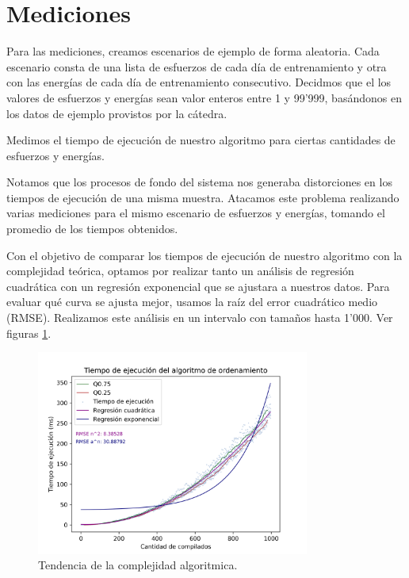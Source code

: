 \section{Mediciones}


Para las mediciones, creamos escenarios de ejemplo de forma aleatoria. Cada escenario consta de
una lista de esfuerzos de cada día de entrenamiento y otra con las energías de cada día de
entrenamiento consecutivo. Decidmos que el los valores de esfuerzos y energías sean valor enteros
entre 1 y 99'999, basándonos en los datos de ejemplo provistos por la cátedra.

Medimos el tiempo de ejecución de nuestro algoritmo para ciertas cantidades de esfuerzos y energías.

Notamos que los procesos de fondo del sistema nos generaba distorciones en los tiempos de ejecución
de una misma muestra. Atacamos este problema realizando varias mediciones para el mismo escenario de
esfuerzos y energías, tomando el promedio de los tiempos obtenidos.

Con el objetivo de comparar los tiempos de ejecución de nuestro algoritmo con la complejidad teórica, optamos por 
realizar tanto un análisis de regresión cuadrática con un regresión exponencial que se ajustara a nuestros datos.
Para evaluar qué curva se ajusta mejor, usamos la raíz del error cuadrático medio (RMSE). Realizamos este análisis en un
intervalo con tamaños hasta 1'000. Ver figuras \ref{fig:tiempos_puntos}.

\begin{figure}[H]
    \centering
    \includegraphics[width=0.8\textwidth]{img/tiempos_puntos.png}
    \caption{Tendencia de la complejidad algoritmica.}
    \label{fig:tiempos_puntos}
\end{figure}

